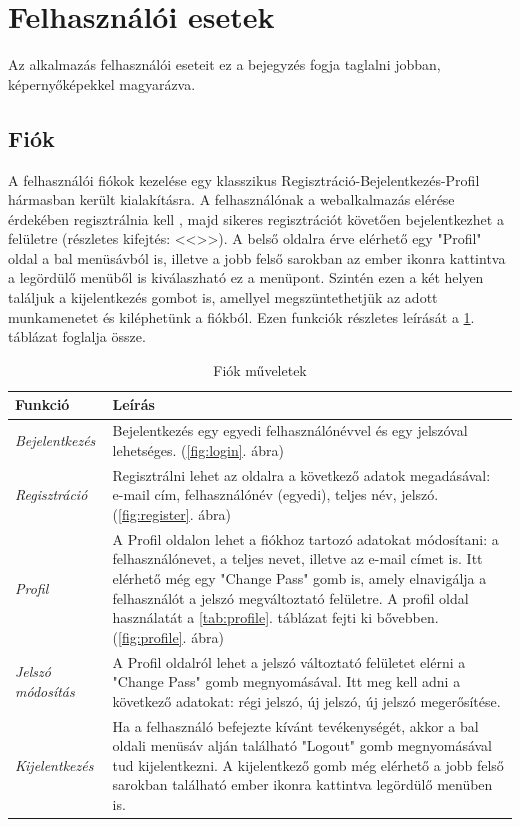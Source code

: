 \section{Felhasználói esetek}
Az alkalmazás felhasználói eseteit ez a bejegyzés fogja taglalni jobban, képernyőképekkel magyarázva.

\subsection{Fiók}
A felhasználói fiókok kezelése egy klasszikus Regisztráció-Bejelentkezés-Profil hármasban került kialakításra. A felhasználónak a webalkalmazás elérése érdekében regisztrálnia kell , majd sikeres regisztrációt követően bejelentkezhet a felületre (részletes kifejtés: <<>>). A belső oldalra érve elérhető egy "Profil" oldal a bal menüsávból is, illetve a jobb felső sarokban az ember ikonra kattintva a legördülő menüből is kiválaszható ez a menüpont. Szintén ezen a két helyen találjuk a kijelentkezés gombot is, amellyel megszüntethetjük az adott munkamenetet és kiléphetünk a fiókból. Ezen funkciók részletes leírását a \ref{tab:account}. táblázat foglalja össze.
\begin{table}[H]
	\centering
	\begin{tabular}{ | m{} | m{} | }
		\hline
		\textbf{Funkció} & \textbf{Leírás} \\
		\hline \hline
		\emph{Bejelentkezés} & Bejelentkezés egy egyedi felhasználónévvel és egy jelszóval lehetséges. (\ref{fig:login}. ábra) \\
		\hline
		\emph{Regisztráció} &  Regisztrálni lehet az oldalra a következő adatok megadásával: e-mail cím, felhasználónév (egyedi), teljes név, jelszó. (\ref{fig:register}. ábra)  \\
		\hline
		\emph{Profil} & A Profil oldalon lehet a fiókhoz tartozó adatokat módosítani: a felhasználónevet, a teljes nevet, illetve az e-mail címet is. Itt elérhető még egy "Change Pass" gomb is, amely elnavigálja a felhasználót a jelszó megváltoztató felületre. A profil oldal használatát a \ref{tab:profile}. táblázat fejti ki bővebben. (\ref{fig:profile}. ábra) \\
		\hline
		\emph{Jelszó módosítás} & A Profil oldalról lehet a jelszó változtató felületet elérni a "Change Pass" gomb megnyomásával. Itt meg kell adni a következő adatokat: régi jelszó, új jelszó, új jelszó megerősítése. \\
		\hline
		\emph{Kijelentkezés} & Ha a felhasználó befejezte kívánt tevékenységét, akkor a bal oldali menüsáv alján található "Logout" gomb megnyomásával tud kijelentkezni. A kijelentkező gomb még elérhető a jobb felső sarokban található ember ikonra kattintva legördülő menüben is. \\
		\hline
	\end{tabular}
	\caption{Fiók műveletek}
	\label{tab:account}
\end{table}

